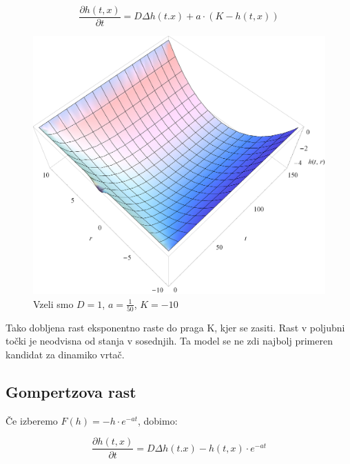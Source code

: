 \documentclass[a4paper, oneside, 12pt]{book}
\begin{document}
            \begin{equation}
              \frac{ \partial h(t,x) }{ \partial t} = D \Delta h(t.x) + a \cdot (K - h(t,x))
              \label{difuzija-omejena-eksponentna-rast}
            \end{equation}

            \begin{figure}[H]
              \begin{center}
                \includegraphics[width=14cm]{slike/difuzija-omejena-eksponentna-rast2}
              \end{center}
              \caption{Vzeli smo $D=1$, $a=\frac{1}{50}$, $K=-10$}
              \label{fig:difuzija-omejena-eksponentna-rast}
            \end{figure}

          Tako dobljena rast eksponentno raste do praga K, kjer se zasiti. Rast v poljubni točki je neodvisna od stanja v sosednjih. Ta model se ne zdi najbolj primeren kandidat za dinamiko vrtač.



          \subsection{Gompertzova rast}

          Če izberemo $F(h) = - h \cdot e^{-a t}$, dobimo:

            \begin{equation}
              \frac{ \partial h(t,x) }{ \partial t} = D \Delta h(t.x) - h(t,x) \cdot e^{-a t}
              \label{difuzija-gompertzova-rast}
            \end{equation}
\end{document}
